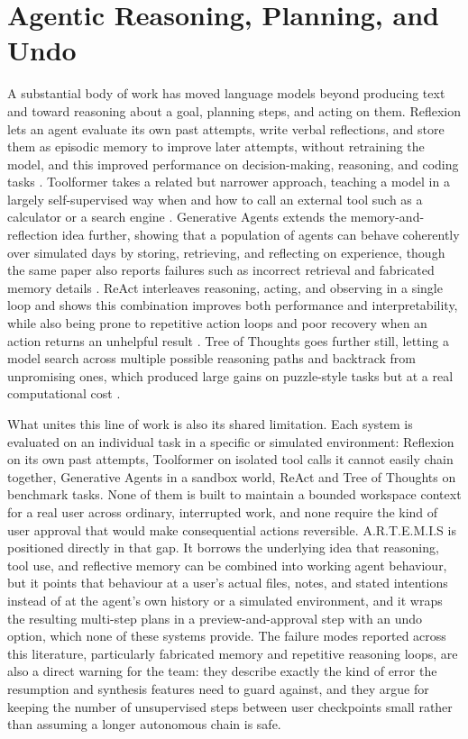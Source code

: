 \documentclass[11pt,a4paper]{report}
\newcommand{\artemis}{A.R.T.E.M.I.S}
\begin{document}
\section{Agentic Reasoning, Planning, and Undo}

A substantial body of work has moved language models beyond producing
text and toward reasoning about a goal, planning steps, and acting on
them. Reflexion lets an agent evaluate its own past attempts, write
verbal reflections, and store them as episodic memory to improve later
attempts, without retraining the model, and this improved performance
on decision-making, reasoning, and coding tasks
\autocite{shinn2023reflexion}. Toolformer takes a related but narrower
approach, teaching a model in a largely self-supervised way when and
how to call an external tool such as a calculator or a search engine
\autocite{schick2023toolformer}. Generative Agents extends the
memory-and-reflection idea further, showing that a population of
agents can behave coherently over simulated days by storing,
retrieving, and reflecting on experience, though the same paper also
reports failures such as incorrect retrieval and fabricated memory
details \autocite{park2023generative}. ReAct interleaves reasoning,
acting, and observing in a single loop and shows this combination
improves both performance and interpretability, while also being
prone to repetitive action loops and poor recovery when an action
returns an unhelpful result \autocite{yao2023react}. Tree of Thoughts
goes further still, letting a model search across multiple possible
reasoning paths and backtrack from unpromising ones, which produced
large gains on puzzle-style tasks but at a real computational cost
\autocite{yao2023tot}.

What unites this line of work is also its shared limitation. Each
system is evaluated on an individual task in a specific or simulated
environment: Reflexion on its own past attempts, Toolformer on
isolated tool calls it cannot easily chain together, Generative Agents
in a sandbox world, ReAct and Tree of Thoughts on benchmark tasks.
None of them is built to maintain a bounded workspace context for a
real user across ordinary, interrupted work, and none require the
kind of user approval that would make consequential actions
reversible. \artemis{} is positioned directly in that gap. It borrows
the underlying idea that reasoning, tool use, and reflective memory
can be combined into working agent behaviour, but it points that
behaviour at a user's actual files, notes, and stated intentions
instead of at the agent's own history or a simulated environment, and
it wraps the resulting multi-step plans in a preview-and-approval step
with an undo option, which none of these systems provide. The failure
modes reported across this literature, particularly fabricated memory
and repetitive reasoning loops, are also a direct warning for the
team: they describe exactly the kind of error the resumption and
synthesis features need to guard against, and they argue for keeping
the number of unsupervised steps between user checkpoints small rather
than assuming a longer autonomous chain is safe.
\end{document}
